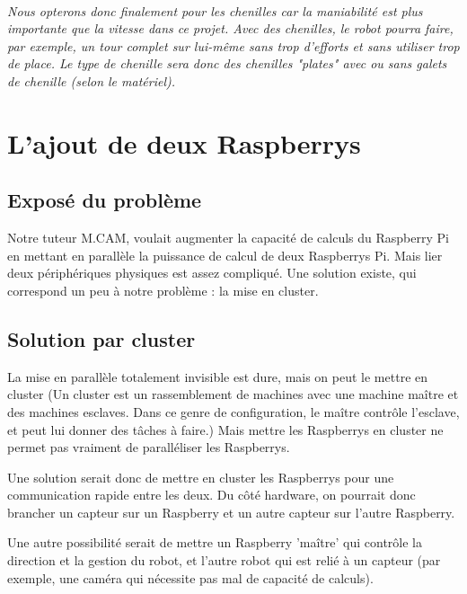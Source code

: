 \documentclass{PackagerQualityN}
\begin{document}
\paragraph{}
\textit{Nous opterons donc finalement pour les chenilles car la maniabilité est plus importante que la vitesse dans ce projet. Avec des chenilles, le robot pourra faire, par exemple, un tour complet sur lui-même sans trop d'efforts et sans utiliser trop de place. Le type de chenille sera donc des chenilles "plates" avec ou sans galets de chenille (selon le matériel).}





\newp
\section{L’ajout de deux Raspberrys}
\subsection{Exposé du problème}
Notre tuteur M.CAM, voulait augmenter la capacité de calculs du Raspberry Pi en mettant en parallèle la puissance de calcul de deux Raspberrys Pi. Mais lier deux périphériques physiques est assez compliqué. Une solution existe, qui correspond un peu à notre problème : la mise en cluster.

\subsection{Solution par cluster}
La mise en parallèle totalement invisible est dure, mais on peut le mettre en cluster
(Un cluster est un rassemblement de machines avec une machine maître et des machines esclaves. Dans ce genre de configuration, le maître contrôle l’esclave, et peut lui donner des tâches à faire.)
Mais mettre les Raspberrys en cluster ne permet pas vraiment de paralléliser les Raspberrys.

Une solution serait donc de mettre en cluster les Raspberrys pour une communication rapide entre les deux. Du côté hardware, on pourrait donc brancher un capteur sur un Raspberry et un autre capteur sur l’autre Raspberry.

Une autre possibilité serait de mettre un Raspberry 'maître' qui contrôle la direction et la gestion du robot, et l'autre robot qui est relié à un capteur (par exemple, une caméra qui nécessite pas mal de capacité de calculs).
\newp
\end{document}
